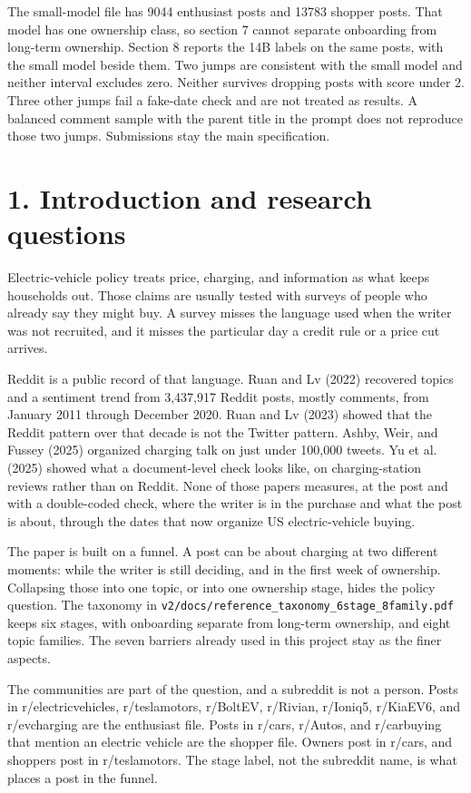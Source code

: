 \documentclass[11pt]{article}
\begin{document}
The small-model file has 9044 enthusiast posts and 13783 shopper posts. That model has one ownership class, so section 7 cannot separate onboarding from long-term ownership. Section 8 reports the 14B labels on the same posts, with the small model beside them. Two jumps are consistent with the small model and neither interval excludes zero. Neither survives dropping posts with score under 2. Three other jumps fail a fake-date check and are not treated as results. A balanced comment sample with the parent title in the prompt does not reproduce those two jumps. Submissions stay the main specification.


\section{1. Introduction and research questions}

Electric-vehicle policy treats price, charging, and information as what keeps households out. Those claims are usually tested with surveys of people who already say they might buy. A survey misses the language used when the writer was not recruited, and it misses the particular day a credit rule or a price cut arrives.


Reddit is a public record of that language. Ruan and Lv (2022) recovered topics and a sentiment trend from 3,437,917 Reddit posts, mostly comments, from January 2011 through December 2020. Ruan and Lv (2023) showed that the Reddit pattern over that decade is not the Twitter pattern. Ashby, Weir, and Fussey (2025) organized charging talk on just under 100,000 tweets. Yu et al. (2025) showed what a document-level check looks like, on charging-station reviews rather than on Reddit. None of those papers measures, at the post and with a double-coded check, where the writer is in the purchase and what the post is about, through the dates that now organize US electric-vehicle buying.


The paper is built on a funnel. A post can be about charging at two different moments: while the writer is still deciding, and in the first week of ownership. Collapsing those into one topic, or into one ownership stage, hides the policy question. The taxonomy in \texttt{v2/docs/reference\_taxonomy\_6stage\_8family.pdf} keeps six stages, with onboarding separate from long-term ownership, and eight topic families. The seven barriers already used in this project stay as the finer aspects.


The communities are part of the question, and a subreddit is not a person. Posts in r/electricvehicles, r/teslamotors, r/BoltEV, r/Rivian, r/Ioniq5, r/KiaEV6, and r/evcharging are the enthusiast file. Posts in r/cars, r/Autos, and r/carbuying that mention an electric vehicle are the shopper file. Owners post in r/cars, and shoppers post in r/teslamotors. The stage label, not the subreddit name, is what places a post in the funnel.
\end{document}
